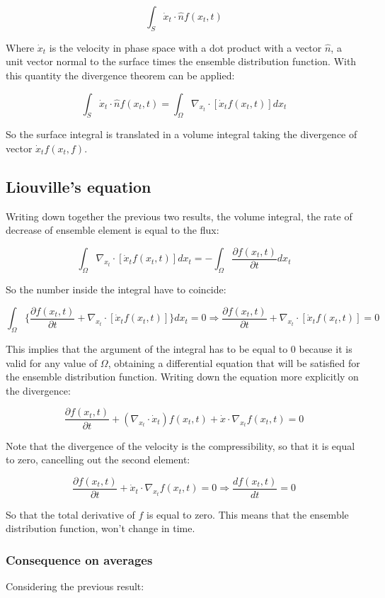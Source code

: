 	$$\int_S\dot{x}_t\cdot\hat{n} f(x_t,t)$$

	Where $\dot{x}_t$ is the velocity in phase space with a dot product with a vector $\hat{n}$, a unit vector normal to the surface times the ensemble distribution function.
	With this quantity the divergence theorem can be applied:

	$$\int_S\dot{x}_t\cdot\hat{n}f(x_t,t) = \int_\Omega\nabla_{x_t}\cdot[\dot{x}_tf(x_t,t)]dx_t$$

	So the surface integral is translated in a volume integral taking the divergence of vector $\dot{x}_t f(x_t, f)$.

	\subsection{Liouville's equation}
	Writing down together the previous two results, the volume integral, the rate of decrease of ensemble element is equal to the flux:

	$$\int_\Omega\nabla_{x_t}\cdot[\dot{x}_tf(x_t, t)]dx_t = -\int_\Omega\frac{\partial f(x_t, t)}{\partial t}dx_t$$

	So the number inside the integral have to coincide:

	$$\int_\Omega\biggl\{\frac{\partial f(x_t, t)}{\partial t} + \nabla_{x_t}\cdot[\dot{x}_tf(x_t, t)]\biggr\}dx_t = 0\Rightarrow \frac{\partial f(x_t, t)}{\partial t} + \nabla_{x_t}\cdot[\dot{x}_tf(x_t, t)] = 0$$

	This implies that the argument of the integral has to be equal to $0$ because it is valid for any value of $\Omega$, obtaining a differential equation that will be satisfied for the ensemble distribution function.
	Writing down the equation more explicitly on the divergence:

	$$\frac{\partial f(x_t, t)}{\partial t} + (\nabla_{x_t}\cdot\dot{x}_t)f(x_t, t) + \dot{x}\cdot\nabla_{x_t}f(x_t, t) = 0$$

	Note that the divergence of the velocity is the compressibility, so that it is equal to zero, cancelling out the second element:

	$$\frac{\partial f(x_t, t)}{\partial t} + \dot{x}_t\cdot\nabla_{x_t}f(x_t, t) = 0\Rightarrow \frac{df(x_t, t)}{dt} = 0$$

	So that the total derivative of $f$ is equal to zero.
	This means that the ensemble distribution function, won't change in time.

		\subsubsection{Consequence on averages}
		Considering the previous result:

